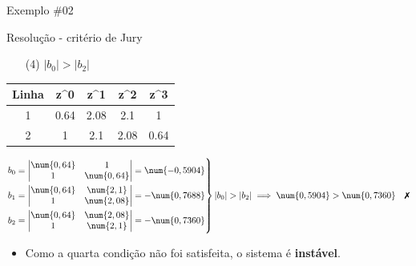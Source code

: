 \begin{frame}{Exemplo \#02}
\begin{block}{Resolução - critério de Jury}
\begin{enumerate}
	\item[(4)] $|b_{0}|>|b_{2}|$
\end{enumerate}
\vspace{-0.5cm}
\begin{longtable}{cCCCC}
	\toprule
	Linha & z^{0} 	& z^{1} & z^{2} & z^{3}	\\  & \num{0,64}	& \num{2,08}	& \num{2,1} 	& 1		\\
		2 & 1 		& \num{2,1}	& \num{2,08}	& \num{0,64}	\\ \bottomrule
\end{longtable}

\vspace{-0.3cm}

\[ \left. \begin{aligned}
b_{0}&=\begin{vmatrix}
\num{0,64} & 1\\1 & \num{0,64}
\end{vmatrix}=\num{-0,5904}\\
b_{1}&=\begin{vmatrix}
\num{0,64} & \num{2,1}\\1 & \num{2,08}
\end{vmatrix}=-\num{0,7688}\\
b_{2}&=\begin{vmatrix}
\num{0,64} & \num{2,08}\\1 & \num{2,1}
\end{vmatrix}=-\num{0,7360}
\end{aligned}\right\rbrace |b_{0}|>|b_{2}| \implies \num{0,5904} > \num{0,7360} \quad \text{\xmark} \]
\vspace{-0.2cm}
\begin{itemize}
    \item Como a quarta condição não foi satisfeita, o sistema é \textbf{instável}.
\end{itemize}
\end{block}
\end{frame}


